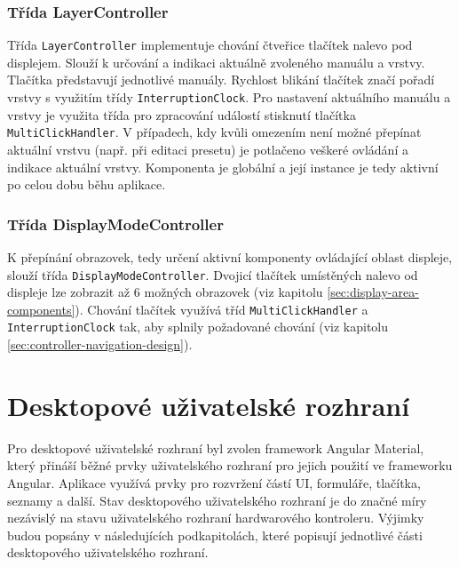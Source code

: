 \documentclass[thesis=M,czech]{FITthesis}[2019/03/06]
\begin{document}
			\subsubsection{Třída LayerController}
				Třída \texttt{LayerController} implementuje chování čtveřice tlačítek nalevo pod displejem. Slouží k určování a indikaci aktuálně zvoleného manuálu a vrstvy.
				Tlačítka představují jednotlivé manuály. Rychlost blikání tlačítek značí pořadí vrstvy s využitím třídy \texttt{InterruptionClock}. Pro nastavení
				aktuálního manuálu a vrstvy je využita třída pro zpracování událostí stisknutí tlačítka \texttt{Multi\-Clic\-kHandler}.
				V případech, kdy kvůli omezením není možné přepínat aktuální vrstvu (např. při editaci presetu) je potlačeno veškeré ovládání a indikace aktuální vrstvy.
				Komponenta je globální a její instance je tedy aktivní po celou dobu běhu aplikace.
			
			\subsubsection{Třída DisplayModeController}
				K přepínání obrazovek, tedy určení aktivní komponenty ovládající oblast displeje, slouží třída \texttt{Display\-Mode\-Controller}. Dvojicí tlačítek
				umístěných nalevo od displeje lze zobrazit až 6 možných obrazovek (viz kapitolu \ref{sec:display-area-components}). Chování tlačítek využívá
				tříd \texttt{Multi\-Click\-Handler} a \texttt{Interruption\-Clock} tak, aby splnily požadované chování (viz kapitolu \ref{sec:controller-navigation-design}).
	
	\section{Desktopové uživatelské rozhraní}
		Pro desktopové uživatelské rozhraní byl zvolen framework Angular Material, který přináší běžné prvky
		uživatelského rozhraní pro jejich použití ve frameworku Angular. Aplikace využívá prvky pro rozvržení
		částí UI, formuláře, tlačítka, seznamy a další. Stav desktopového uživatelského rozhraní je do značné míry
		nezávislý na stavu uživatelského rozhraní hardwarového kontroleru. Výjimky budou popsány v následujících podkapitolách, které 
		popisují jednotlivé části desktopového uživatelského rozhraní.
		
\end{document}
